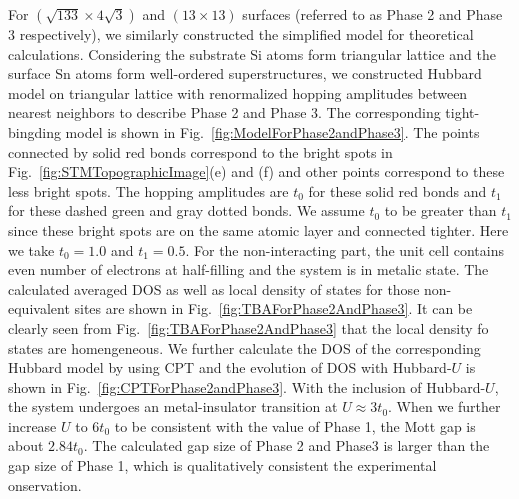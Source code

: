 \documentclass[aps,prb,amsfonts,amsmath,amssymb,showpacs,groupedaddress,superscriptaddress]{revtex4-1}
\begin{document}
For $(\sqrt{133} \times 4\sqrt{3})$ and $(13 \times 13)$ surfaces (referred to as Phase 2 and Phase 3 respectively), we similarly constructed the simplified model for theoretical calculations. Considering the substrate Si atoms form triangular lattice and the surface Sn atoms form well-ordered superstructures, we constructed Hubbard model on triangular lattice with renormalized hopping amplitudes between nearest neighbors to describe Phase 2 and Phase 3. The corresponding tight-bingding model is shown in Fig.~\ref{fig:ModelForPhase2andPhase3}. The points connected by solid red bonds correspond to the bright spots in Fig.~\ref{fig:STMTopographicImage}(e) and (f) and other points correspond to these less bright spots. The hopping amplitudes are $t_{0}$ for these solid red bonds and $t_{1}$ for these dashed green and gray dotted bonds. We assume $t_{0}$ to be greater than $t_{1}$ since these bright spots are on the same atomic layer and connected tighter. Here we take $t_{0} = 1.0$ and $t_{1} = 0.5$. For the non-interacting part, the unit cell contains even number of electrons at half-filling and the system is in metalic state. The calculated averaged DOS as well as local density of states for those non-equivalent sites are shown in Fig.~\ref{fig:TBAForPhase2AndPhase3}. It can be clearly seen from Fig.~\ref{fig:TBAForPhase2AndPhase3} that the local density fo states are homengeneous. We further calculate the DOS of the corresponding Hubbard model by using CPT and the evolution of DOS with Hubbard-$U$ is shown in Fig.~\ref{fig:CPTForPhase2andPhase3}. With the inclusion of Hubbard-$U$, the system undergoes an metal-insulator transition at $U \approx 3 t_{0}$. When we further increase $U$ to $6 t_{0}$ to be consistent with the value of Phase 1, the Mott gap is about $2.84 t_{0}$. The calculated gap size of Phase 2 and Phase3 is larger than the gap size of Phase 1, which is qualitatively consistent the experimental onservation.
\end{document}

